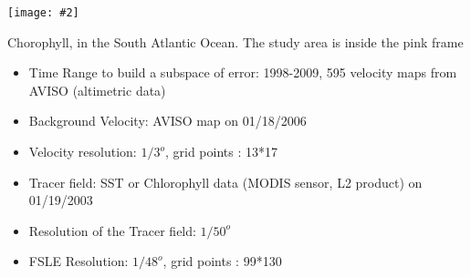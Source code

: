 \documentclass[portrait,a0,final,a4resizeable]{a0poster}
\newenvironment{poster}{
  \begin{center}
  \begin{minipage}[c]{1.0\textwidth}
}{
  \end{minipage} 
  \end{center}
}
\newenvironment{pcolumn}[1]{
  \begin{minipage}{#1\textwidth}
}{
  \end{minipage}
}
\newcommand{\myfig}[3][0]{
\begin{center}
  \vspace{0.10cm}
  \texttt{[image: \#2]}
\end{center}}
\begin{document}
\begin{poster}
\begin{multicols}{2}
\begin{center}
{    \vspace*{0.2cm}
    {\large  
    \vspace*{0.2cm}
\begin{minipage}{0.35\textwidth}
 
      \myfig{./pict/s_atl/s_atlb.eps}{0.99}
      \small{Chorophyll, in the South Atlantic Ocean. The study area is inside the pink frame}
\end{minipage}
\begin{minipage}{0.65\textwidth}
  \begin{itemize}
    \item Time Range to build a subspace of error: 1998-2009, 595 velocity maps from AVISO (altimetric data)
    \item Background Velocity: AVISO map on 01/18/2006
    \item Velocity resolution: $1/3^o$, grid points : 13*17
    \item Tracer field: SST or Chlorophyll data (MODIS sensor, L2 product) on 01/19/2003
    \item Resolution of the Tracer field: $1/50^o$
    \item FSLE Resolution: $1/48^o$, grid points : 99*130
  \end{itemize}
\end{minipage}
%
  } %
  } %
  \end{center}
 

\end{multicols}
\end{poster}
\end{document}
